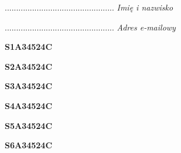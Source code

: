 \begin{turn}{90}\begin{minipage}{\linewidth} \vspace{20mm} ................................................  \textit{Imię i nazwisko}\end{minipage}\end{turn}

\begin{turn}{90}\begin{minipage}{\linewidth} \vspace{20mm} ................................................  \textit{Adres e-mailowy}\end{minipage}\end{turn}

\begin{turn}{90}\huge \begin{minipage}{\linewidth} \vspace{10mm}\textbf{S1A34524C}\end{minipage}\end{turn}

\begin{turn}{90}\huge \begin{minipage}{\linewidth} \vspace{10mm}\textbf{S2A34524C}\end{minipage}\end{turn}

\begin{turn}{90}\huge \begin{minipage}{\linewidth} \vspace{10mm}\textbf{S3A34524C}\end{minipage}\end{turn}

\begin{turn}{90}\huge \begin{minipage}{\linewidth} \vspace{10mm}\textbf{S4A34524C}\end{minipage}\end{turn}

\begin{turn}{90}\huge \begin{minipage}{\linewidth} \vspace{10mm}\textbf{S5A34524C}\end{minipage}\end{turn}

\begin{turn}{90}\huge \begin{minipage}{\linewidth} \vspace{10mm}\textbf{S6A34524C}\end{minipage}\end{turn}

